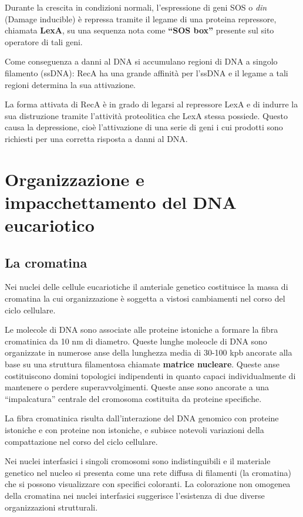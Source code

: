 \documentclass[11pt]{book}
\begin{document}
Durante la crescita in condizioni normali, l'espressione di geni SOS o
\emph{din} (Damage inducible) è repressa tramite il legame di una
proteina repressore, chiamata \textbf{LexA}, su una sequenza nota come
\textbf{``SOS box''} presente sul sito operatore di tali geni.

Come conseguenza a danni al DNA si accumulano regioni di DNA a singolo
filamento (ssDNA): RecA ha una grande affinità per l'ssDNA e il legame a
tali regioni determina la sua attivazione.

La forma attivata di RecA è in grado di legarsi al repressore LexA e di
indurre la sua distruzione tramite l'attività proteolitica che LexA
stessa possiede. Questo causa la depressione, cioè l'attivazione di una
serie di geni i cui prodotti sono richiesti per una corretta risposta a
danni al DNA.

\section{Organizzazione e impacchettamento del DNA
eucariotico}\label{organizzazione-e-impacchettamento-del-dna-eucariotico}

\subsection{La cromatina}\label{la-cromatina}

Nei nuclei delle cellule eucariotiche il amteriale genetico costituisce
la massa di cromatina la cui organizzazione è soggetta a vistosi
cambiamenti nel corso del ciclo cellulare.

Le molecole di DNA sono associate alle proteine istoniche a formare la
fibra cromatinica da 10 nm di diametro. Queste lunghe moleocle di DNA
sono organizzate in numerose anse della lunghezza media di 30-100 kpb
ancorate alla base su una struttura filamentosa chiamate \textbf{matrice
nucleare}. Queste anse costituiscono domini topologici indipendenti in
quanto capaci individualmente di mantenere o perdere superavvolgimenti.
Queste anse sono ancorate a una ``impalcatura'' centrale del cromosoma
costituita da proteine specifiche.

La fibra cromatinica risulta dall'interazione del DNA genomico con
proteine istoniche e con proteine non istoniche, e subisce notevoli
variazioni della compattazione nel corso del ciclo cellulare.

Nei nuclei interfasici i singoli cromosomi sono indistinguibili e il
materiale genetico nel nucleo si presenta come una rete diffusa di
filamenti (la cromatina) che si possono visualizzare con specifici
coloranti. La colorazione non omogenea della cromatina nei nuclei
interfasici suggerisce l'esistenza di due diverse organizzazioni
strutturali.
\end{document}
